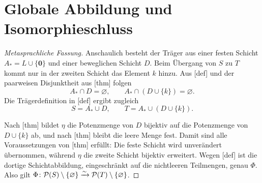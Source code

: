 \documentclass[main.tex]{subfiles}
\begin{document}
\section{Globale Abbildung und Isomorphieschluss}

\begin{proof}[Metasprachliche Fassung]
Anschaulich besteht der Träger aus einer festen Schicht
\(A_*=L\cup\{\mathbf0\}\) und einer beweglichen Schicht \(D\). Beim
Übergang von \(S\) zu \(T\) kommt nur in der zweiten Schicht das Element
\(k\) hinzu. Aus [def] und der
paarweisen Disjunktheit aus
[thm] folgen
\[
  A_*\cap D=\varnothing,
  \qquad
  A_*\cap(D\cup\{k\})=\varnothing.
\]
Die Trägerdefinition in [def] ergibt
zugleich
\[
  S=A_*\cup D,
  \qquad
  T=A_*\cup(D\cup\{k\}).
\]

Nach [thm] bildet
\(\eta\) die Potenzmenge von \(D\) bijektiv auf die Potenzmenge von
\(D\cup\{k\}\) ab, und nach
[thm] bleibt die leere
Menge fest. Damit sind alle Voraussetzungen von
[thm] erfüllt: Die feste
Schicht wird unverändert übernommen, während \(\eta\) die zweite Schicht
bijektiv erweitert. Wegen [def] ist die
dortige Schichtabbildung, eingeschränkt auf die nichtleeren Teilmengen,
genau \(\Phi\). Also gilt \(\Phi\colon\mathcal{P}(S)\setminus\{\varnothing\}\xrightarrow{\sim}\mathcal{P}(T)\setminus\{\varnothing\}\).
\end{proof}

\MogTableProofHeading
\begin{tabproofwide}
\end{tabproofwide}
\end{document}
